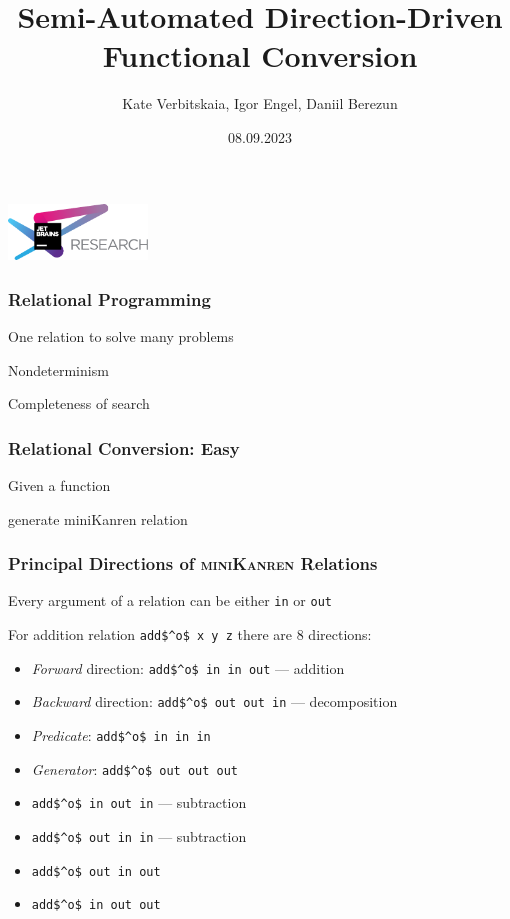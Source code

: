 \documentclass[xcolor=table]{beamer}
\title[Functional Conversion for microKanren]{Semi-Automated Direction-Driven Functional Conversion}
\institute[JetBrains Research]{
JetBrains Research, Programming Languages and Tools Lab

\vspace{1cm}

miniKanren workshop @ ICFP 2023
}
\author[Kate, Igor]{Kate Verbitskaia, Igor Engel, Daniil Berezun}
\date{08.09.2023}
\newcommand{\mk}{\textsc{miniKanren}\xspace}
\begin{document}
{
\begin{frame}[fragile]
   \begin{center}
      \includegraphics[height=1.5cm]{pictures/jetbrainsResearch.pdf}
    \end{center}
  \titlepage
\end{frame}
}
\begin{frame}[fragile]
  \frametitle{Relational Programming}
\begin{center}
One relation to solve many problems
\end{center}

\begin{center}
Nondeterminism
\end{center}

\begin{center}
Completeness of search
\end{center}

\end{frame}

\begin{frame}[fragile]
  \frametitle{Relational Conversion: Easy}
Given a function


generate miniKanren relation

\end{frame}


\begin{frame}[fragile]
  \frametitle{Principal Directions of \mk Relations}
\begin{center}
  Every argument of a relation can be either \lstinline{in} or \lstinline{out}
\end{center}

\begin{center}
  For addition relation \lstinline{add$^o$ x y z} there are 8 directions:
\end{center}

\begin{itemize}
  \item \emph{Forward} direction: \lstinline{add$^o$ in in out} --- addition
  \item \emph{Backward} direction: \lstinline{add$^o$ out out in} --- decomposition
  \item \emph{Predicate}: \lstinline{add$^o$ in in in}
  \item \emph{Generator}: \lstinline{add$^o$ out out out}
  \item \lstinline{add$^o$ in out in} --- subtraction
  \item \lstinline{add$^o$ out in in} --- subtraction
  \item \lstinline{add$^o$ out in out}
  \item \lstinline{add$^o$ in out out}
\end{itemize}
\end{frame}
\end{document}
